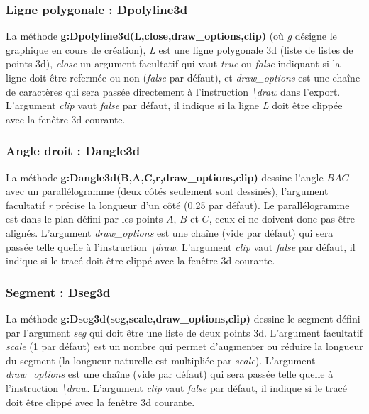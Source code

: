 \subsubsection{Ligne polygonale : Dpolyline3d}

La méthode \textbf{g:Dpolyline3d(L,close,draw\_options,clip)} (où \emph{g} désigne le graphique en cours de création), \emph{L} est une ligne polygonale 3d (liste de listes de points 3d), \emph{close} un argument facultatif qui vaut \emph{true} ou \emph{false} indiquant si la ligne doit être refermée ou non (\emph{false} par défaut), et \emph{draw\_options} est une chaîne de caractères qui sera passée directement à l'instruction \emph{\textbackslash draw} dans l'export. L'argument \emph{clip} vaut \emph{false} par défaut, il indique si la ligne \emph{L} doit être clippée avec la fenêtre 3d courante.
    
\subsubsection{Angle droit : Dangle3d}

La méthode \textbf{g:Dangle3d(B,A,C,r,draw\_options,clip)} dessine l'angle \(BAC\) avec un parallélogramme (deux côtés seulement sont dessinés), l'argument facultatif \emph{r} précise la longueur d'un côté (0.25 par défaut). Le parallélogramme est dans le plan défini par les points $A$, $B$ et $C$, ceux-ci ne doivent donc pas être alignés. L'argument \emph{draw\_options} est une chaîne (vide par défaut) qui sera passée telle quelle à l'instruction  \emph{\textbackslash draw}. L'argument \emph{clip} vaut \emph{false} par défaut, il indique si le tracé doit être clippé avec la fenêtre 3d courante.
    
\subsubsection{Segment : Dseg3d}

La méthode \textbf{g:Dseg3d(seg,scale,draw\_options,clip)} dessine le segment défini par l'argument \emph{seg} qui doit être une liste de deux points 3d. L'argument facultatif \emph{scale} (1 par défaut) est un nombre qui permet d'augmenter ou réduire la longueur du segment (la longueur naturelle est multipliée par \emph{scale}). L'argument \emph{draw\_options} est une chaîne (vide par défaut) qui sera passée telle quelle à l'instruction \emph{\textbackslash draw}. L'argument \emph{clip} vaut \emph{false} par défaut, il indique si le tracé doit être clippé avec la fenêtre 3d courante.
    
